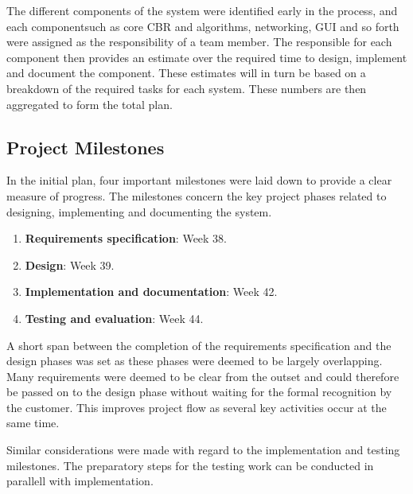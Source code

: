 The different components of the system were identified early in the process, and each componentsuch as core CBR and algorithms, networking, GUI and so forth were assigned as the responsibility of a team member. The responsible for each component then provides an estimate over the required time to design, implement and document the component. These estimates will in turn be based on a breakdown of the required tasks for each system. These numbers are then aggregated to form the total plan.

\subsection{Project Milestones}

In the initial plan, four important milestones were laid down to provide a clear measure of progress. The milestones concern the key project phases related to designing, implementing and documenting the system.

\begin{enumerate}
\item \textbf{Requirements specification}: Week 38.
\item \textbf{Design}: Week 39.
\item \textbf{Implementation and documentation}: Week 42.
\item \textbf{Testing and evaluation}: Week 44.
\end{enumerate}

A short span between the completion of the requirements specification and the design phases was set as these phases were deemed to be largely overlapping. Many requirements were deemed to be clear from the outset and could therefore be passed on to the design phase without waiting for the formal recognition by the customer. This improves project flow as several key activities occur at the same time.

Similar considerations were made with regard to the implementation and testing milestones. The preparatory steps for the testing work can be conducted in parallell with implementation.
